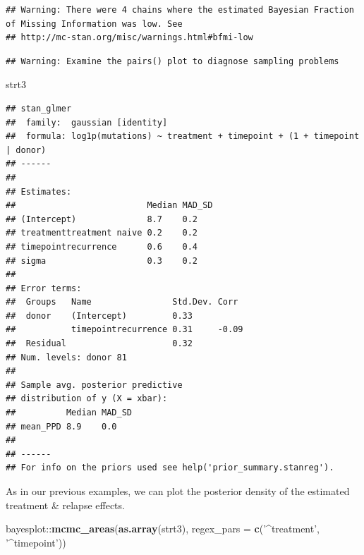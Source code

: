 \documentclass[]{article}
\newenvironment{Shaded}{\begin{snugshade}}{\end{snugshade}}
\newcommand{\KeywordTok}[1]{\textcolor[rgb]{0.13,0.29,0.53}{\textbf{{#1}}}}
\newcommand{\DataTypeTok}[1]{\textcolor[rgb]{0.13,0.29,0.53}{{#1}}}
\newcommand{\StringTok}[1]{\textcolor[rgb]{0.31,0.60,0.02}{{#1}}}
\newcommand{\NormalTok}[1]{{#1}}
\begin{document}
\begin{verbatim}
## Warning: There were 4 chains where the estimated Bayesian Fraction of Missing Information was low. See
## http://mc-stan.org/misc/warnings.html#bfmi-low
\end{verbatim}

\begin{verbatim}
## Warning: Examine the pairs() plot to diagnose sampling problems
\end{verbatim}

\begin{Shaded}
\begin{Highlighting}[]
\NormalTok{strt3}
\end{Highlighting}
\end{Shaded}

\begin{verbatim}
## stan_glmer
##  family:  gaussian [identity]
##  formula: log1p(mutations) ~ treatment + timepoint + (1 + timepoint | donor)
## ------
## 
## Estimates:
##                          Median MAD_SD
## (Intercept)              8.7    0.2   
## treatmenttreatment naive 0.2    0.2   
## timepointrecurrence      0.6    0.4   
## sigma                    0.3    0.2   
## 
## Error terms:
##  Groups   Name                Std.Dev. Corr 
##  donor    (Intercept)         0.33          
##           timepointrecurrence 0.31     -0.09
##  Residual                     0.32          
## Num. levels: donor 81 
## 
## Sample avg. posterior predictive 
## distribution of y (X = xbar):
##          Median MAD_SD
## mean_PPD 8.9    0.0   
## 
## ------
## For info on the priors used see help('prior_summary.stanreg').
\end{verbatim}

As in our previous examples, we can plot the posterior density of the
estimated treatment \& relapse effects.

\begin{Shaded}
\begin{Highlighting}[]
\NormalTok{bayesplot::}\KeywordTok{mcmc_areas}\NormalTok{(}\KeywordTok{as.array}\NormalTok{(strt3), }\DataTypeTok{regex_pars =} \KeywordTok{c}\NormalTok{(}\StringTok{'^treatment'}\NormalTok{, }\StringTok{'^timepoint'}\NormalTok{))}
\end{Highlighting}
\end{Shaded}
\end{document}
